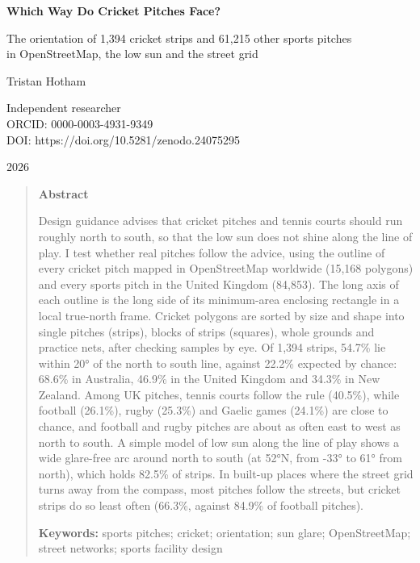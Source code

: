 \documentclass[11pt,a4paper]{article}
\begin{document}
\begin{center}
{\Large\bfseries Which Way Do Cricket Pitches Face?\par}
\vspace{0.4em}
{\large The orientation of 1,394 cricket strips and 61,215 other sports pitches\\in OpenStreetMap, the low sun and the street grid\par}
\vspace{1.2em}
{\large Tristan Hotham\par}
\vspace{0.3em}
{\small Independent researcher\\
ORCID: 0000-0003-4931-9349\\
DOI: https://doi.org/10.5281/zenodo.24075295\par}
\vspace{0.8em}
2026
\end{center}

\begin{quote}
\small
\begin{center}\textbf{Abstract}\end{center}
Design guidance advises that cricket pitches and tennis courts should run roughly north to south, so that the low sun does not shine along the line of play. I test whether real pitches follow the advice, using the outline of every cricket pitch mapped in OpenStreetMap worldwide (15,168 polygons) and every sports pitch in the United Kingdom (84,853). The long axis of each outline is the long side of its minimum-area enclosing rectangle in a local true-north frame. Cricket polygons are sorted by size and shape into single pitches (strips), blocks of strips (squares), whole grounds and practice nets, after checking samples by eye. Of 1,394 strips, 54.7\% lie within 20° of the north to south line, against 22.2\% expected by chance: 68.6\% in Australia, 46.9\% in the United Kingdom and 34.3\% in New Zealand. Among UK pitches, tennis courts follow the rule (40.5\%), while football (26.1\%), rugby (25.3\%) and Gaelic games (24.1\%) are close to chance, and football and rugby pitches are about as often east to west as north to south. A simple model of low sun along the line of play shows a wide glare-free arc around north to south (at 52°N, from -33° to 61° from north), which holds 82.5\% of strips. In built-up places where the street grid turns away from the compass, most pitches follow the streets, but cricket strips do so least often (66.3\%, against 84.9\% of football pitches).

\textbf{Keywords:} sports pitches; cricket; orientation; sun glare; OpenStreetMap; street networks; sports facility design
\end{quote}
\end{document}
